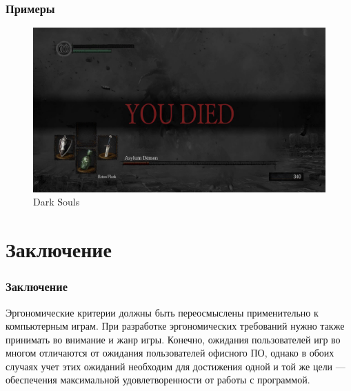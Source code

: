 \documentclass[10pt]{beamer}
\begin{document}
\begin{frame}
  \frametitle{Примеры}
  \centering
  \begin{figure}
    \includegraphics[width=\textwidth]{res/img/darkSouls.jpg}
    \caption{Dark Souls}
  \end{figure}
\end{frame}

\section{Заключение}
\begin{frame}
\frametitle{Заключение}

\begin{block}{}
  Эргономические критерии должны быть переосмыслены применительно к компьютерным играм. При разработке эргономических требований нужно также принимать во внимание и жанр игры. Конечно, ожидания пользователей игр во многом отличаются от ожидания пользователей офисного ПО, однако в обоих случаях учет этих ожиданий необходим для достижения одной и той же цели — обеспечения максимальной удовлетворенности от работы с программой.
\end{block}

\end{frame}
\end{document}
